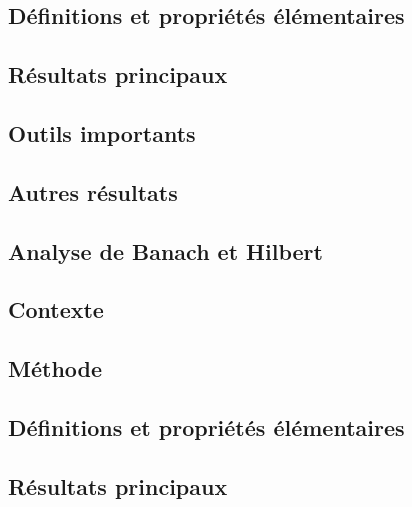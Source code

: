 \documentclass[11pt,a4paper]{article}
\begin{document}
\subsection*{Définitions et propriétés élémentaires}

\subsection*{Résultats principaux}

\subsection*{Outils importants}

\subsection*{Autres résultats}


\newpage
\begin{center}  
\section*{Analyse de Banach et Hilbert} 
\end{center}

%

\subsection*{Contexte}

\subsection*{Méthode}

\subsection*{Définitions et propriétés élémentaires}

\subsection*{Résultats principaux}
\end{document}
